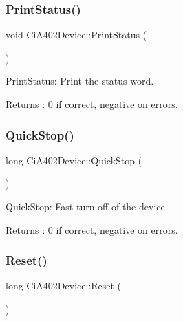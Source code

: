 \mbox{\label{classCiA402Device_a9d5d8df28085395a3ab711107a181ebc}} 
\subsubsection{\texorpdfstring{Print\+Status()}{PrintStatus()}}
{\footnotesize\ttfamily void Ci\+A402\+Device\+::\+Print\+Status (\begin{DoxyParamCaption}{ }\end{DoxyParamCaption})}



Print\+Status\+: Print the status word. 

\begin{DoxyReturn}{Returns}
\+: 0 if correct, negative on errors. 
\end{DoxyReturn}
\mbox{\label{classCiA402Device_a8573afbf420c29aa86cd215d74f4e4e3}} 
\subsubsection{\texorpdfstring{Quick\+Stop()}{QuickStop()}}
{\footnotesize\ttfamily long Ci\+A402\+Device\+::\+Quick\+Stop (\begin{DoxyParamCaption}{ }\end{DoxyParamCaption})}



Quick\+Stop\+: Fast turn off of the device. 

\begin{DoxyReturn}{Returns}
\+: 0 if correct, negative on errors. 
\end{DoxyReturn}
\mbox{\label{classCiA402Device_ac4a6e4987ebe075d0ac07ee5fd4d410c}} 
\subsubsection{\texorpdfstring{Reset()}{Reset()}}
{\footnotesize\ttfamily long Ci\+A402\+Device\+::\+Reset (\begin{DoxyParamCaption}{ }\end{DoxyParamCaption})}



